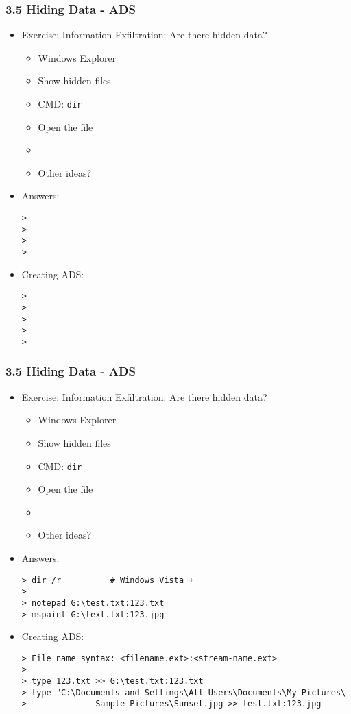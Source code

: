\begin{frame}[fragile]
  \frametitle{3.5 Hiding Data - ADS}
    \begin{itemize}
       \item Exercise: Information Exfiltration: Are there hidden data?
            \begin{itemize}
                \item Windows Explorer
                \item Show hidden files
                \item CMD: \texttt{dir}
                \item Open the file
                \item
                \item Other ideas?
            \end{itemize}
       \item Answers:
  \begin{lstlisting}[basicstyle=\tiny]
>
>
>
>
  \end{lstlisting}
       \item Creating ADS:
  \begin{lstlisting}[basicstyle=\tiny]
>
>
>
>
>
  \end{lstlisting}
    \end{itemize}
\end{frame}


\begin{frame}[fragile]
  \frametitle{3.5 Hiding Data - ADS}
    \begin{itemize}
       \item Exercise: Information Exfiltration: Are there hidden data?
            \begin{itemize}
                \item Windows Explorer
                \item Show hidden files
                \item CMD: \texttt{dir}
                \item Open the file
                \item
                \item Other ideas?
            \end{itemize}
       \item Answers:
  \begin{lstlisting}[basicstyle=\tiny]
> dir /r          # Windows Vista +
>
> notepad G:\test.txt:123.txt
> mspaint G:\text.txt:123.jpg
  \end{lstlisting}
       \item Creating ADS:
  \begin{lstlisting}[basicstyle=\tiny]
> File name syntax: <filename.ext>:<stream-name.ext>
>
> type 123.txt >> G:\test.txt:123.txt
> type "C:\Documents and Settings\All Users\Documents\My Pictures\
>              Sample Pictures\Sunset.jpg >> test.txt:123.jpg
  \end{lstlisting}
    \end{itemize}
\end{frame}


